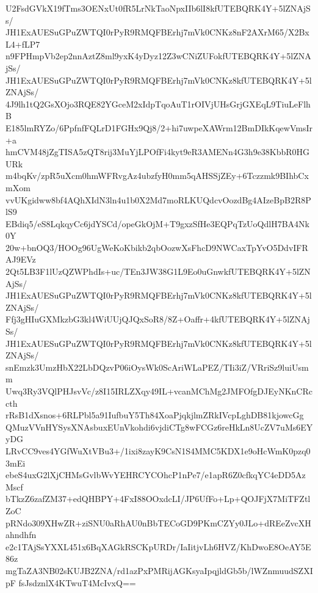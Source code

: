 U2FsdGVkX19fTms3OENxUt0fR5LrNkTaoNpxIIb6lI8kfUTEBQRK4Y+5lZNAjSs/
JH1ExAUESuGPuZWTQI0rPyR9RMQFBErhj7mVk0CNKz8nF2AXrM65/X2BxL4+fLP7
n9FPHmpVb2ep2nnAztZ8ml9yxK4yDyz12Z3wCNiZUFokfUTEBQRK4Y+5lZNAjSs/
JH1ExAUESuGPuZWTQI0rPyR9RMQFBErhj7mVk0CNKz8kfUTEBQRK4Y+5lZNAjSs/
4J9lh1tQ2GsXOjo3RQE82YGceM2xIdpTqoAuT1rOIVjUHsGrjGXEqL9TiuLeFlhB
E185lmRYZo/6PpfnfFQLrD1FGHx9Qj8/2+hi7uwpeXAWrm12BmDIkKqewVmsIr+a
hmCVM48jZgTISA5zQT8rij3MuYjLPOfFi4kyt9eR3AMENn4G3h9e38KbbR0HGURk
m4bqKv/zpR5uXcm0hmWFRvgAz4ubzfyH0mm5qAHSSjZEy+6Tczzmk9BIhbCxmXom
vvUKgidww8bf4AQhXIdN3ln4u1b0X2Md7moRLKUQdcvOozdBg4AIzeBpB2R8PlS9
EBdiq5/eS8LqkqyCc6jdYSCd/opeGkOjM+T9gxzSfHe3EQPqTzUoQdlH7BA4Nk0Y
20w+bnOQ3/HOOg96UgWeKoKbikb2qbOozwXsFhcD9NWCaxTpYvO5DdvIFRAJ9EVz
2Qt5LB3F1lUzQZWPhdIs+uc/TEn3JW38G1L9Eo0uGnwkfUTEBQRK4Y+5lZNAjSs/
JH1ExAUESuGPuZWTQI0rPyR9RMQFBErhj7mVk0CNKz8kfUTEBQRK4Y+5lZNAjSs/
Ffj3gHIuGXMkzbG3kl4WiUUjQJQxSoR8/8Z+Oaffr+4kfUTEBQRK4Y+5lZNAjSs/
JH1ExAUESuGPuZWTQI0rPyR9RMQFBErhj7mVk0CNKz8kfUTEBQRK4Y+5lZNAjSs/
snEmzk3UmzHbX22LbDQzvP06iOysWk0ScAriWLaPEZ/TIi3iZ/VRriSz9luiUsmm
Uwq3Ry3VQlPHJsvVc/z8I15IRLZXqy49IL+vcanMChMg2JMFOfgDJEyNKnCRccth
rRsB1dXsnos+6RLPbl5a91IufbuY5Th84XoaPjqkjlmZRkIVcpLghDB81kjowcGg
QMuzVVnHYSysXNAsbuxEUnVkohdi6vjdiCTg8wFCGz6reHkLn8UcZV7uMs6EYyDG
LRvCC9ves4YGfWuXtVBu3+/1ixi8zayK9CsN1S4MMC5KDX1e9oHcWmK0pzq03mEi
ebeS4uxG2lXjCHMsGvlbWvYEHRCYCOhcP1nPe7/e1apR6Z0cfkqYC4eDD5AzMscf
bTkzZ6zafZM37+edQHBPY+4FxI88OOxdcLI/JP6UfFo+Lp+QOJFjX7MiTFZtlZoC
pRNdo309XHwZR+ziSNU0aRhAU0nBbTECoGD9PKmCZYy0JLo+dREeZvcXHahndhfn
e2c1TAjSsYXXL451x6BqXAGkRSCKpURDr/IaIitjvLh6HVZ/KhDwoE8OeAY5E86z
mgTaZA3NB02sKUJB2ZNA/rd1azPxPMRijAGKsyaIpqjldGb5b/lWZnmuudSZXIpF
fsJsdznlX4KTwuT4McIvxQ==
